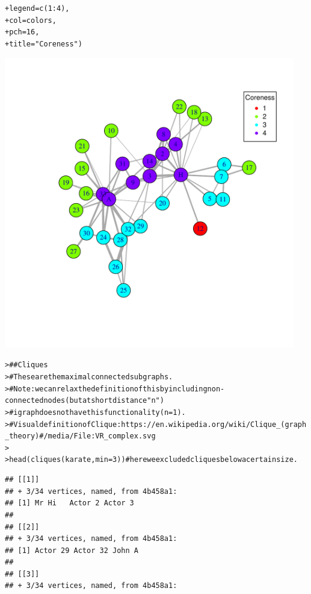 \documentclass[12pt]{article}\usepackage[]{graphicx}\usepackage[]{color}
\makeatletter
\newcommand{\hlnum}[1]{\textcolor[rgb]{0.82,0.78,0.62}{#1}}%
\newcommand{\hlstr}[1]{\textcolor[rgb]{0.82,0.78,0.62}{#1}}%
\newcommand{\hlcom}[1]{\textcolor[rgb]{0.404,0.408,0.42}{#1}}%
\newcommand{\hlopt}[1]{\textcolor[rgb]{0.882,0.878,0.898}{#1}}%
\newcommand{\hlstd}[1]{\textcolor[rgb]{0.882,0.878,0.898}{#1}}%
\newcommand{\hlkwc}[1]{\textcolor[rgb]{0.812,0.522,0.388}{#1}}%
\newcommand{\hlkwd}[1]{\textcolor[rgb]{0.733,0.388,0.812}{#1}}%
\newenvironment{kframe}{%
 \def\at@end@of@kframe{}%
 \ifinner\ifhmode%
  \def\at@end@of@kframe{\end{minipage}}%
  \begin{minipage}{\columnwidth}%
 \fi\fi%
 \def\FrameCommand##1{\hskip\@totalleftmargin \hskip-\fboxsep
 \colorbox{shadecolor}{##1}\hskip-\fboxsep
     \hskip-\linewidth \hskip-\@totalleftmargin \hskip\columnwidth}%
 \MakeFramed {\advance\hsize-\width
   \@totalleftmargin\z@ \linewidth\hsize
   \@setminipage}}%
 {\par\unskip\endMakeFramed%
 \at@end@of@kframe}
\newenvironment{knitrout}{}{} %
\makeatother
\begin{document}
\begin{flushleft}
\begin{center}
\begin{knitrout}
\begin{kframe}
\begin{alltt}
\hlstd{+ }       \hlkwc{legend}\hlstd{=}\hlkwd{c}\hlstd{(}\hlnum{1}\hlopt{:}\hlnum{4}\hlstd{),}
\hlstd{+ }       \hlkwc{col} \hlstd{= colors,}
\hlstd{+ }       \hlkwc{pch} \hlstd{=} \hlnum{16}\hlstd{,}
\hlstd{+ }       \hlkwc{title} \hlstd{=} \hlstr{"Coreness"}\hlstd{)}
\end{alltt}
\end{kframe}
\includegraphics[width=5in]{figure/Assort-2} 
\begin{kframe}\begin{alltt}
\hlstd{> }\hlcom{## Cliques}
\hlstd{> }\hlcom{#   These are the maximal connected subgraphs.}
\hlstd{> }\hlcom{#   Note: we can relax the definition of this by including non-connected nodes (but at short distance "n")}
\hlstd{> }\hlcom{#         igraph does not have this functionality (n=1).}
\hlstd{> }\hlcom{# Visual definition of Clique: https://en.wikipedia.org/wiki/Clique_(graph_theory)#/media/File:VR_complex.svg}
\hlstd{> }
\hlstd{> }\hlkwd{head}\hlstd{(}\hlkwd{cliques}\hlstd{(karate,} \hlkwc{min}\hlstd{=}\hlnum{3}\hlstd{))} \hlcom{# here we excluded cliques below a certain size.}
\end{alltt}
\begin{verbatim}
## [[1]]
## + 3/34 vertices, named, from 4b458a1:
## [1] Mr Hi   Actor 2 Actor 3
## 
## [[2]]
## + 3/34 vertices, named, from 4b458a1:
## [1] Actor 29 Actor 32 John A  
## 
## [[3]]
## + 3/34 vertices, named, from 4b458a1:

\end{verbatim}
\end{kframe}
\end{knitrout}
\end{center}
\end{flushleft}
\end{document}
